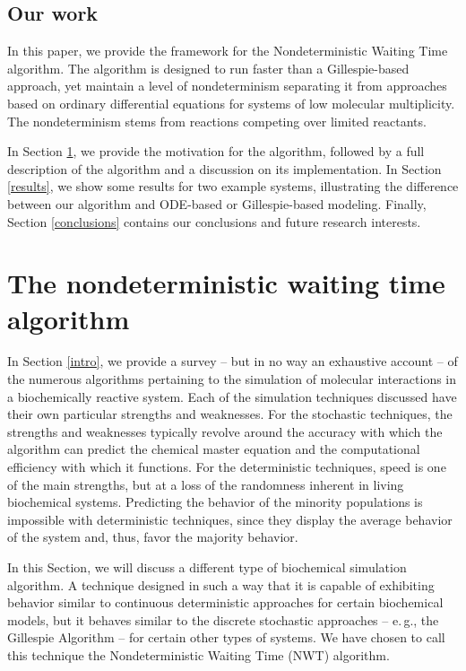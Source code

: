 \documentclass[copyright]{eptcs}
\begin{document}
\subsection{Our work}
In this paper, we provide the framework for the Nondeterministic Waiting Time algorithm.  The algorithm is designed to run faster than a Gillespie-based approach, yet maintain a level of nondeterminism separating it from approaches based on ordinary differential equations for systems of low molecular multiplicity.  The nondeterminism stems from reactions competing over limited reactants.

In Section \ref{algorithm}, we provide the motivation for the algorithm, followed by a full description of the algorithm and a discussion on its implementation.  In Section \ref{results}, we show some results for two example systems, illustrating the difference between our algorithm and ODE-based or Gillespie-based modeling.  Finally, Section \ref{conclusions} contains our conclusions and future research interests.







\section{The nondeterministic waiting time algorithm}\label{algorithm}

In Section \ref{intro}, we provide a survey -- but in no way an exhaustive account -- of the numerous algorithms pertaining to the simulation of molecular interactions in a biochemically reactive system.  Each of the simulation techniques discussed have their own particular strengths and weaknesses.  For the stochastic techniques, the strengths and weaknesses typically revolve around the accuracy with which the algorithm can predict the chemical master equation and the computational efficiency with which it functions.  For the deterministic techniques, speed is one of the main strengths, but at a loss of the randomness inherent in living biochemical systems.  Predicting the behavior of the minority populations is impossible with deterministic techniques, since they display the average behavior of the system and, thus, favor the majority behavior.

In this Section, we will discuss a different type of biochemical simulation algorithm.  A technique designed in such a way that it is capable of exhibiting behavior similar to continuous deterministic approaches for certain biochemical models, but it behaves similar to the discrete stochastic approaches -- e.\,g., the Gillespie Algorithm -- for certain other types of systems.  We have chosen to call this technique the Nondeterministic Waiting Time (NWT) algorithm.
\end{document}
